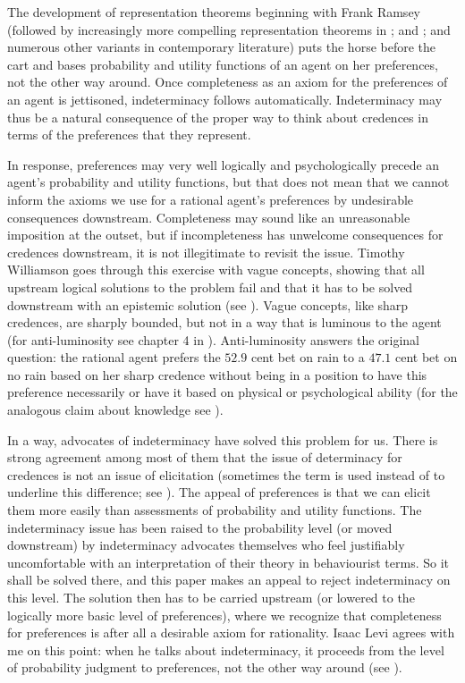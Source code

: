 \documentclass[11pt]{article}
\begin{document}
The development of representation theorems beginning with Frank Ramsey
(followed by increasingly more compelling representation theorems in
; and ; and numerous other
variants in contemporary literature) puts the horse before the cart
and bases probability and utility functions of an agent on her
preferences, not the other way around. Once completeness as an axiom
for the preferences of an agent is jettisoned, indeterminacy follows
automatically. Indeterminacy may thus be a natural consequence of the
proper way to think about credences in terms of the preferences that
they represent.

In response, preferences may very well logically and psychologically
precede an agent's probability and utility functions, but that does
not mean that we cannot inform the axioms we use for a rational
agent's preferences by undesirable consequences downstream.
Completeness may sound like an unreasonable imposition at the outset,
but if incompleteness has unwelcome consequences for credences
downstream, it is not illegitimate to revisit the issue. Timothy
Williamson goes through this exercise with vague concepts, showing
that all upstream logical solutions to the problem fail and that it
has to be solved downstream with an epistemic solution (see
). Vague concepts, like sharp credences, are
sharply bounded, but not in a way that is luminous to the agent (for
anti-luminosity see chapter 4 in ).
Anti-luminosity answers the original question: the rational agent
prefers the $52.9$ cent bet on rain to a $47.1$ cent bet on no rain
based on her sharp credence without being in a position to have this
preference necessarily or have it based on physical or psychological
ability (for the analogous claim about knowledge see
).

In a way, advocates of indeterminacy have solved this problem for us.
There is strong agreement among most of them that the issue of
determinacy for credences is not an issue of elicitation (sometimes
the term  is used instead of 
to underline this difference; see ). The appeal
of preferences is that we can elicit them more easily than assessments
of probability and utility functions. The indeterminacy issue has been
raised to the probability level (or moved downstream) by indeterminacy
advocates themselves who feel justifiably uncomfortable with an
interpretation of their theory in behaviourist terms. So it shall be
solved there, and this paper makes an appeal to reject indeterminacy
on this level. The solution then has to be carried upstream (or
lowered to the logically more basic level of preferences), where we
recognize that completeness for preferences is after all a desirable
axiom for rationality. Isaac Levi agrees with me on this point: when
he talks about indeterminacy, it proceeds from the level of
probability judgment to preferences, not the other way around (see
).
\end{document}
